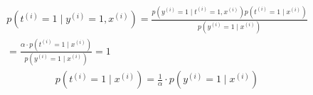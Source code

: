 \begin{answer}
\begin{eqnarray*}
p(t^{(i)}=1\mid y^{(i)} = 1, x^{(i)}) =\frac{p(y^{(i)} = 1\mid t^{(i)}=1, x^{(i)})p(t^{(i)}=1\mid x^{(i)})}{p(y^{(i)} = 1\mid x^{(i)})}\\
=\frac{\alpha\cdot p(t^{(i)}=1\mid x^{(i)})}{p(y^{(i)} = 1\mid x^{(i)})}=1
\end{eqnarray*}
\begin{eqnarray*}
p(t^{(i)}=1\mid x^{(i)})=\frac{1}{\alpha}\cdot p(y^{(i)} = 1\mid x^{(i)})
\end{eqnarray*}
\end{answer}
